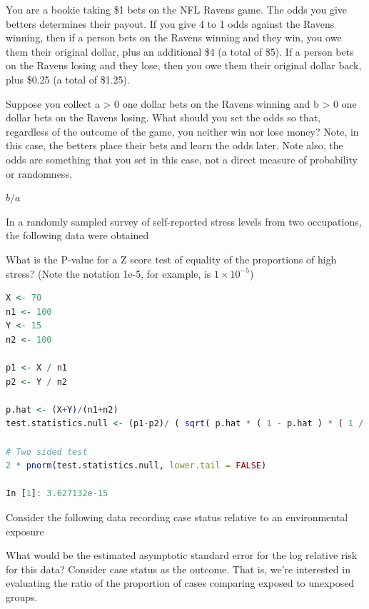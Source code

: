 \documentclass{homework}
\begin{document}
\begin{tcolorbox}[title=Question 1]
You are a bookie taking \$1 bets on the NFL Ravens game. The odds you give betters determines their payout. If you give 4 to 1 odds against the Ravens winning, then if a person bets on the Ravens winning and they win, you owe them their original dollar, plus an additional \$4 (a total of \$5). If a person bets on the Ravens losing and they lose, then you owe them their original dollar back, plus \$0.25 (a total of \$1.25).

Suppose you collect a > 0 one dollar bets on the Ravens winning and b > 0 one dollar bets on the Ravens losing. What should you set the odds so that, regardless of the outcome of the game, you neither win nor lose money? Note, in this case, the betters place their bets and learn the odds later. Note also, the odds are something that you set in this case, not a direct measure of probability or randomness.
\end{tcolorbox}

$b/a$

\begin{tcolorbox}[title=Question 3]
In a randomly sampled survey of self-reported stress levels from two occupations, the following data were obtained


What is the P-value for a Z score test of equality of the proportions of high stress? (Note the notation 1e-5, for example, is $1\times 10^{-5}$)
\end{tcolorbox}

\begin{lstlisting}[language=R]
X <- 70
n1 <- 100
Y <- 15
n2 <- 100

p1 <- X / n1
p2 <- Y / n2

p.hat <- (X+Y)/(n1+n2)
test.statistics.null <- (p1-p2)/ ( sqrt( p.hat * ( 1 - p.hat ) * ( 1 / n1 + 1 / n2  )  )   )

# Two sided test
2 * pnorm(test.statistics.null, lower.tail = FALSE)

In [1]: 3.627132e-15
\end{lstlisting}

\begin{tcolorbox}[title=Question 4]
Consider the following data recording case status relative to an environmental exposure


What would be the estimated asymptotic standard error for the log relative risk for this data? Consider case status as the outcome. That is, we're interested in evaluating the ratio of the proportion of cases comparing exposed to unexposed groups. 
\end{tcolorbox}
\end{document}
